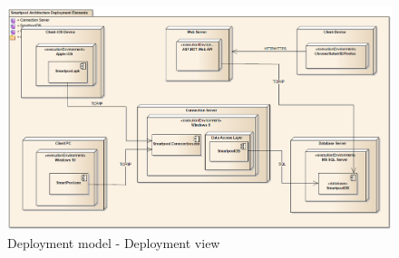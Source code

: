 \begin{figure}
	\centering
	\includegraphics[width=\linewidth]{figs/arkitektur/deploymentView.PNG}
	\caption{Deployment model - Deployment view}
	\label{fig:deploymentView}
\end{figure}